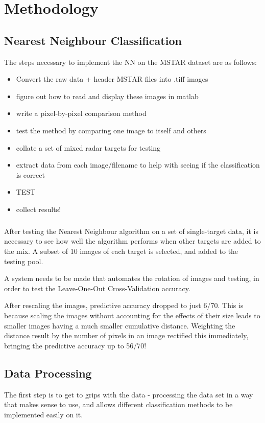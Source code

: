 \chapter{Methodology}
\section{Nearest Neighbour Classification}
The steps necessary to implement the NN on the MSTAR dataset are as follows:\\

\begin{itemize}
\item Convert the raw data + header MSTAR files into .tiff images
\item figure out how to read and display these images in matlab
\item write a pixel-by-pixel comparison method
\item test the method by comparing one image to itself and others
\item collate a set of mixed radar targets for testing
\item extract data from each image/filename to help with seeing if the classification is correct
\item TEST
\item collect results!
\end{itemize}

\paragraph{}
After testing the Nearest Neighbour algorithm on a set of single-target data, it is necessary to see how well the algorithm performs when other targets are added to the mix. A subset of 10 images of each target is selected, and added to the testing pool.

A system needs to be made that automates the rotation of images and testing, in order to test the Leave-One-Out Cross-Validation accuracy.

After rescaling the images, predictive accuracy dropped to just 6/70. This is because scaling the images without accounting for the effects of their size leads to smaller images having a much smaller cumulative distance. Weighting the distance result by the number of pixels in an image rectified this immediately, bringing the predictive accuracy up to 56/70!



\section{Data Processing}
The first step is to get to grips with the data - processing the data set in a way that makes sense to use, and allows different classification methods to be implemented easily on it.

